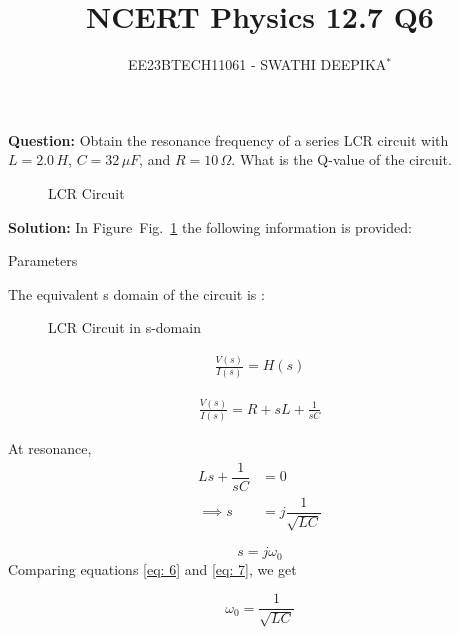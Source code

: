 \documentclass[journal,12pt,twocolumn]{IEEEtran}
\title{
	
\title{NCERT Physics 12.7 Q6}
\author{EE23BTECH11061 - SWATHI DEEPIKA$^{*}$%
}


}
\newcommand\figref{Fig.~\ref}
\theoremstyle{remark}
\begin{document}
\maketitle

\textbf{Question:} 
Obtain the resonance frequency of a series LCR circuit with $L = 2.0\, H$, $C = 32\, \mu F$, and $R = 10\, \Omega$. What is the Q-value of the circuit.\\

\begin{figure}[!h]
	\centering
	
	\caption{LCR Circuit}
	\label{fig:2}
\end{figure}
     
\textbf{Solution: }
In Figure~\figref{fig:2} the following information is provided:
 
 

 \begin{table}[h]
 	\centering
 	\resizebox{6 cm}{!}{
 		
 	}
 	\vspace{6 pt}
 	\caption{Parameters}
 	\label{tab:my_label} 
 \end{table}
 
 The equivalent s domain of the circuit is :

\begin{figure}[!h]
 \centering
    
    \caption{LCR Circuit in s-domain}
    
\end{figure}

\begin{align}
\frac{V(s)}{I(s)} = H(s)
\end{align}

\begin{align}
\frac{V(s)}{I(s)} = R + sL + \frac{1}{sC}\label{eq: 1} 
\end{align}

At resonance, 
\begin{align}
    Ls + \dfrac{1}{sC} &= 0\\
    \implies s &= j\dfrac{1}{\sqrt{LC}} \label{eq: 6}
\end{align}

\begin{equation}
    s = j\omega_0 \label{eq: 7}
\end{equation}
Comparing equations \eqref{eq: 6} and \eqref{eq: 7}, we get

\begin{equation}
    \omega_0 = \dfrac{1}{\sqrt{LC}}\label{eq: 8}
\end{equation}
\end{document}
